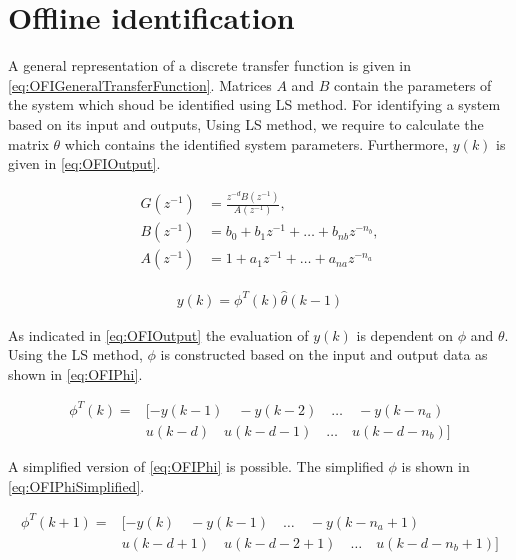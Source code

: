 \FloatBarrier
\section{Offline identification}
A general representation of a discrete transfer function is given in \autoref{eq:OFIGeneralTransferFunction}. Matrices $A$ and $B$ contain the parameters of the system which shoud be identified using LS method. For identifying a system based on its input and outputs, Using LS method, we require to calculate the matrix $\theta$ which contains the identified system parameters. Furthermore, $y(k)$ is given in \autoref{eq:OFIOutput}.

\begin{equation}
	\begin{aligned}
		G(z^{-1})& = \frac{z^{-d}B(z^{-1})}{A(z^{-1})}, \\
		B(z^{-1}) &= b_0 + b_1 z^{-1} + \dots + b_{nb} z^{-n_b}, \\
		A(z^{-1}) &= 1 + a_1 z^{-1} + \dots + a_{na} z^{-n_a} 
	\end{aligned}
	\label{eq:OFIGeneralTransferFunction}
\end{equation}

\begin{equation}
	\begin{gathered}
		y(k) = \phi^T(k) \hat{\theta}(k-1) 
	\end{gathered}
	\label{eq:OFIOutput}
\end{equation}

As indicated in \autoref{eq:OFIOutput} the evaluation of $y(k)$ is dependent on $\phi$ and $\theta$. 
Using the LS method, $\phi$ is constructed based on the input and output data as shown in \autoref{eq:OFIPhi}.  

\begin{equation}
	\begin{aligned}
		\phi^T(k) = &[-y(k-1) \quad -y(k-2) \quad \dots \quad -y(k-n_a) \\
		& u(k-d) \quad u(k-d-1) \quad \dots \quad u(k-d-n_b)] 
	\end{aligned}
	\label{eq:OFIPhi}
\end{equation}

\noindent A simplified version of \autoref{eq:OFIPhi} is possible. The simplified $\phi$ is shown in \autoref{eq:OFIPhiSimplified}.

\begin{equation}
	\begin{aligned}
		\phi^T(k+1) = &[-y(k) \quad -y(k-1) \quad \dots \quad -y(k-n_a+1) \\
		\quad & u(k-d+1) \quad u(k-d-2+1) \quad \dots \quad u(k-d-n_b+1)] \\
	\end{aligned}
	\label{eq:OFIPhiSimplified}
\end{equation}

